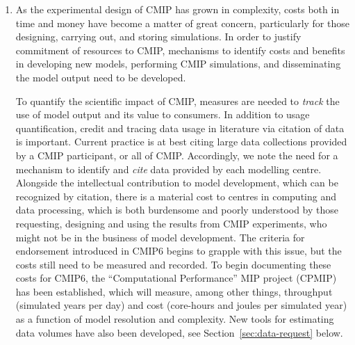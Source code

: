 \documentclass[gmd,manuscript]{copernicus}
\newcommand{\urlref}[2] {\href{#1}{#2}\footnote{\url{#1}, retrieved \today.}}
\begin{document}
\begin{enumerate}
  In addition, there is an increased interest in climate analytics as
  a service \citep{ref:balajietal2011,ref:schnaseetal2017}. This
  follows the principle of placing analysis close to the data. Some
  centres plan to add resources that combine archival and analysis
  capabilities, e.g., NCAR's \urlref{https://goo.gl/sYTxC2}{CMIP
    Analysis Platform}, or the UK's JASMIN
  \citep{ref:lawrenceetal2013}.. There are also new efforts to bring
  climate data storage and analysis to the cloud era
  \citep[e.g][]{ref:duffyetal2015}. Platforms such as
  \urlref{http://pangeo-data.org/}{Pangeo} show promise in this
  realm, and widespread experimentation and adoption is encouraged.
\item As the experimental design of CMIP has grown in complexity,
  costs both in time and money have become a matter of great concern,
  particularly for those designing, carrying out, and storing
  simulations. In order to justify commitment of resources to CMIP,
  mechanisms to identify costs and benefits in developing new models,
  performing CMIP simulations, and disseminating the model output need
  to be developed.

  To quantify the scientific impact of CMIP, measures are needed to
  \emph{track} the use of model output and its value to consumers. In
  addition to usage quantification, credit and tracing data usage in
  literature via citation of data is important. Current practice is at
  best citing large data collections provided by a CMIP participant,
  or all of CMIP. Accordingly, we note the need for a mechanism to
  identify and \emph{cite} data provided by each modelling centre.
  Alongside the intellectual contribution to model development, which
  can be recognized by citation, there is a material cost to centres
  in computing and data processing, which is both burdensome
  and poorly understood by those requesting, designing and using the
  results from
  CMIP experiments, who might not be in the business of model
  development. The criteria for endorsement introduced in CMIP6
  \citep[see Table~1 in][]{ref:eyringetal2016a} begins to grapple with
  this issue, but the costs still need to be measured and recorded. To
  begin documenting these costs for CMIP6, the ``Computational
  Performance'' MIP project (CPMIP) \citep{ref:balajietal2017} has
  been established, which will
  measure, among other things, throughput (simulated years per day)
  and cost (core-hours and joules per simulated year) as a function of
  model resolution and complexity. New tools for estimating data volumes
  have also been developed, see Section~\ref{sec:data-request} below.


\end{enumerate}
\end{document}

